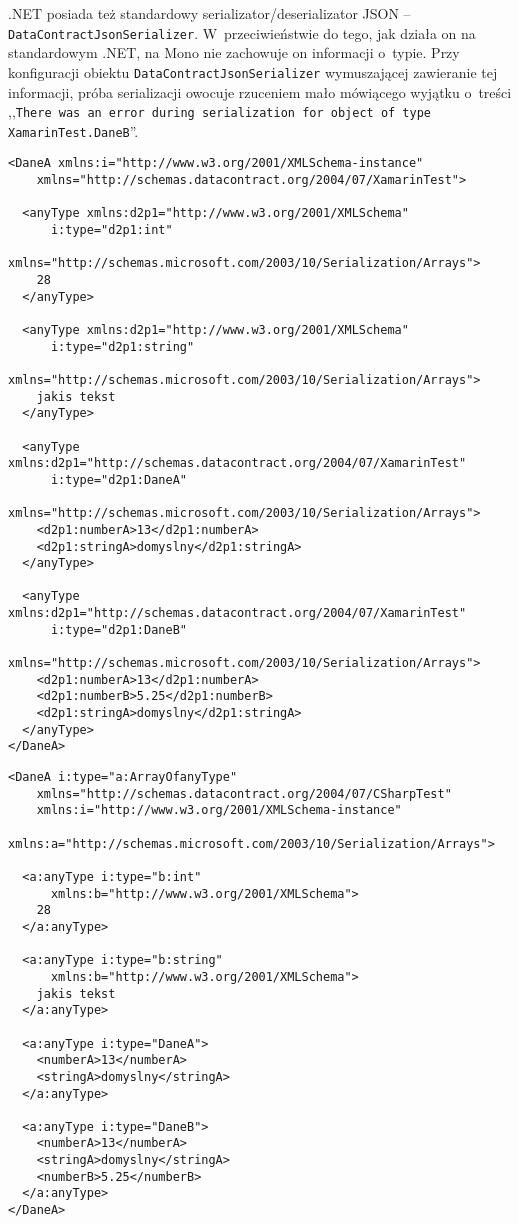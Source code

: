 \begin{description}
.NET posiada też standardowy serializator/deserializator JSON -- \texttt{DataContractJsonSerializer}.
W~przeciwieństwie do tego, jak działa on na standardowym .NET, na Mono nie zachowuje on informacji o~typie.
Przy konfiguracji obiektu \texttt{DataContractJsonSerializer} wymuszającej zawieranie tej informacji, próba serializacji owocuje rzuceniem mało mówiącego wyjątku o~treści ,,\texttt{There was an error during serialization for object of type XamarinTest.DaneB}''.

\begin{lstlisting}[float, caption={Testowa tablica zserializowana przez \texttt{DataContractSerializer} pod Mono.}, label=code:xamrinArray]
<DaneA xmlns:i="http://www.w3.org/2001/XMLSchema-instance"
    xmlns="http://schemas.datacontract.org/2004/07/XamarinTest">
  
  <anyType xmlns:d2p1="http://www.w3.org/2001/XMLSchema"
      i:type="d2p1:int"
      xmlns="http://schemas.microsoft.com/2003/10/Serialization/Arrays">
    28
  </anyType>
  
  <anyType xmlns:d2p1="http://www.w3.org/2001/XMLSchema"
      i:type="d2p1:string"
      xmlns="http://schemas.microsoft.com/2003/10/Serialization/Arrays">
    jakis tekst
  </anyType>
  
  <anyType xmlns:d2p1="http://schemas.datacontract.org/2004/07/XamarinTest"
      i:type="d2p1:DaneA"
      xmlns="http://schemas.microsoft.com/2003/10/Serialization/Arrays">
    <d2p1:numberA>13</d2p1:numberA>
    <d2p1:stringA>domyslny</d2p1:stringA>
  </anyType>
  
  <anyType xmlns:d2p1="http://schemas.datacontract.org/2004/07/XamarinTest"
      i:type="d2p1:DaneB"
      xmlns="http://schemas.microsoft.com/2003/10/Serialization/Arrays">
    <d2p1:numberA>13</d2p1:numberA>
    <d2p1:numberB>5.25</d2p1:numberB>
    <d2p1:stringA>domyslny</d2p1:stringA>
  </anyType>
</DaneA>
\end{lstlisting}

\begin{lstlisting}[float, caption={Testowa tablica zserializowana przez \texttt{DataContractSerializer} pod .NET 4.5.}, label=code:dotNetArray]
<DaneA i:type="a:ArrayOfanyType"
    xmlns="http://schemas.datacontract.org/2004/07/CSharpTest"
    xmlns:i="http://www.w3.org/2001/XMLSchema-instance"
    xmlns:a="http://schemas.microsoft.com/2003/10/Serialization/Arrays">
    
  <a:anyType i:type="b:int"
      xmlns:b="http://www.w3.org/2001/XMLSchema">
    28
  </a:anyType>
  
  <a:anyType i:type="b:string"
      xmlns:b="http://www.w3.org/2001/XMLSchema">
    jakis tekst
  </a:anyType>
  
  <a:anyType i:type="DaneA">
    <numberA>13</numberA>
    <stringA>domyslny</stringA>
  </a:anyType>
  
  <a:anyType i:type="DaneB">
    <numberA>13</numberA>
    <stringA>domyslny</stringA>
    <numberB>5.25</numberB>
  </a:anyType>
</DaneA>
\end{lstlisting}

\end{description}

